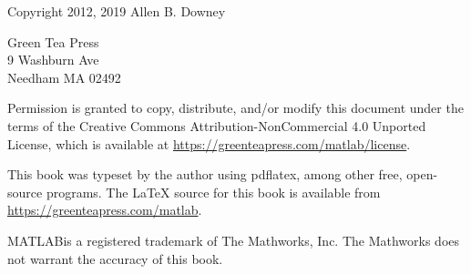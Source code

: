 \vspace{2in}

\begin{center}
{\Large \thetitle}

\vspace{0.25in}

Copyright 2012, 2019 Allen B. Downey
\end{center}

\vspace{0.25in}

\begin{flushleft}
Green Tea Press       \\
9 Washburn Ave \\
Needham MA 02492
\end{flushleft}

Permission is granted to copy, distribute, and/or modify this document
under the terms of the Creative Commons Attribution-NonCommercial 4.0 Unported License, which is available at \url{https://greenteapress.com/matlab/license}.

This book was typeset by the author using pdflatex,
among other free, open-source programs.
The LaTeX source for this book is available from
\url{https://greenteapress.com/matlab}.

MATLAB\myreg is a registered trademark of The
Mathworks, Inc.  The Mathworks does not warrant the accuracy
of this book.


\dominitoc
\dominilof
\dominilot

\brieftableofcontents

\tableofcontents
\adjustmtc{}



\mainmatter


































\printindex



